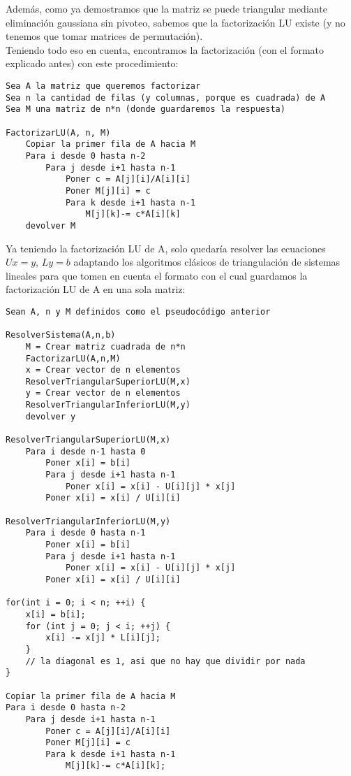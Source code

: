 Además, como ya demostramos que la matriz se puede triangular mediante eliminación gaussiana sin pivoteo, sabemos que la factorización LU existe (y no tenemos que tomar matrices de permutación). \\
Teniendo todo eso en cuenta, encontramos la factorización (con el formato explicado antes) con este procedimiento:

\begin{lstlisting}
Sea A la matriz que queremos factorizar
Sea n la cantidad de filas (y columnas, porque es cuadrada) de A
Sea M una matriz de n*n (donde guardaremos la respuesta)

FactorizarLU(A, n, M)
    Copiar la primer fila de A hacia M
    Para i desde 0 hasta n-2
        Para j desde i+1 hasta n-1
            Poner c = A[j][i]/A[i][i]
            Poner M[j][i] = c
            Para k desde i+1 hasta n-1
                M[j][k]-= c*A[i][k]
    devolver M
\end{lstlisting}

Ya teniendo la factorización LU de A, solo quedaría resolver las ecuaciones $Ux = y$, $Ly = b$ adaptando los algoritmos clásicos de triangulación de sistemas lineales para que tomen en cuenta el formato con el cual guardamos la factorización LU de A en una sola matriz:

\begin{lstlisting}
Sean A, n y M definidos como el pseudocódigo anterior

ResolverSistema(A,n,b)
    M = Crear matriz cuadrada de n*n
    FactorizarLU(A,n,M)
    x = Crear vector de n elementos
    ResolverTriangularSuperiorLU(M,x)
    y = Crear vector de n elementos
    ResolverTriangularInferiorLU(M,y)
    devolver y

ResolverTriangularSuperiorLU(M,x)
    Para i desde n-1 hasta 0
        Poner x[i] = b[i]
        Para j desde i+1 hasta n-1
            Poner x[i] = x[i] - U[i][j] * x[j]
        Poner x[i] = x[i] / U[i][i]

ResolverTriangularInferiorLU(M,y)
    Para i desde 0 hasta n-1
        Poner x[i] = b[i]
        Para j desde i+1 hasta n-1
            Poner x[i] = x[i] - U[i][j] * x[j]
        Poner x[i] = x[i] / U[i][i]

for(int i = 0; i < n; ++i) {
    x[i] = b[i];
    for (int j = 0; j < i; ++j) {
        x[i] -= x[j] * L[i][j];
    }
    // la diagonal es 1, asi que no hay que dividir por nada
}

Copiar la primer fila de A hacia M
Para i desde 0 hasta n-2
    Para j desde i+1 hasta n-1
        Poner c = A[j][i]/A[i][i]
        Poner M[j][i] = c
        Para k desde i+1 hasta n-1
            M[j][k]-= c*A[i][k];
\end{lstlisting}

